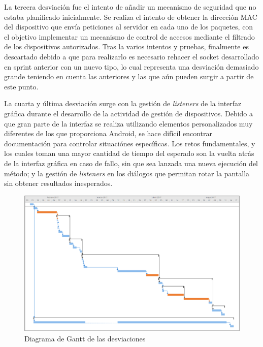 \documentclass[12pt]{article}
\begin{document}
        La tercera desviación fue el intento de añadir un mecanismo de seguridad que no estaba planificado inicialmente. Se realiza el intento de obtener la dirección MAC del dispositivo que envía peticiones al servidor en cada uno de los paquetes, con el objetivo implementar un mecanismo de control de accesos mediante el filtrado de los dispositivos autorizados. Tras la varios intentos y pruebas, finalmente es descartado debido a que para realizarlo es necesario rehacer el socket desarrollado en sprint anterior con un nuevo tipo, lo cual representa una desviación demasiado grande teniendo en cuenta las anteriores y las que aún pueden surgir a partir de este punto.

        La cuarta y última desviación surge con la gestión de \textit{listeners} de la interfaz gráfica durante el desarrollo de la actividad de gestión de dispositivos. Debido a que gran parte de la interfaz se realiza utilizando elementos personalizados muy diferentes de los que proporciona Android, se hace difícil encontrar documentación para controlar situaciónes específicas. Los retos fundamentales, y los cuales toman una mayor cantidad de tiempo del esperado son la vuelta atrás de la interfaz gráfica en caso de fallo, sin que sea lanzada una nueva ejecución del método; y la gestión de \textit{listeners} en los diálogos que permitan rotar la pantalla sin obtener resultados inesperados.
        
        \begin{figure}[h!]
            \centering
                \includegraphics[scale=0.7]{deviations_gantt.eps}
                \caption*{Diagrama de Gantt de las desviaciones}
                \label{fig:deviations_gantt}
        \end{figure}
\end{document}
